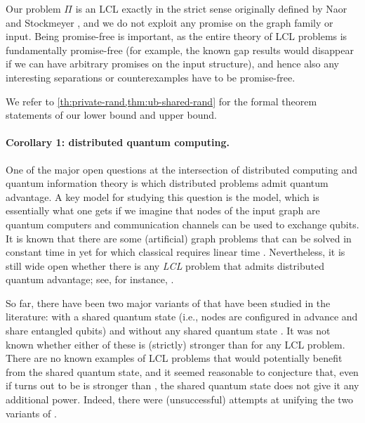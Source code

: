 \documentclass[11pt]{article}
\begin{document}
Our problem $\Pi$ is an LCL exactly in the strict sense originally defined by Naor and Stockmeyer \cite{naor-stockmeyer1995}, and we do not exploit any promise on the graph family or input. Being promise-free is important, as the entire theory of LCL problems is fundamentally promise-free (for example, the known gap results would disappear if we can have arbitrary promises on the input structure), and hence also any interesting separations or counterexamples have to be promise-free.

We refer to \cref{th:private-rand,thm:ub-shared-rand} for the formal theorem statements of our lower bound and upper bound.


\paragraph{Corollary 1: distributed quantum computing.}

One of the major open questions at the intersection of distributed computing and
quantum information theory is which distributed problems admit quantum
advantage. A key model for studying this question is the \qlocal model, which is
essentially what one gets if we imagine that nodes of the input graph are
quantum computers and communication channels can be used to exchange qubits. It
is known that there are some (artificial) graph problems that can be solved in
constant time in \qlocal yet for which classical \local requires linear time
\cite{legall19_quantum_stacs}.
Nevertheless, it is still wide open whether there is any \emph{LCL} problem that
admits distributed quantum advantage; see, for instance,
\cite{akbari24_online_arxiv,coiteux-roy24quantum-coloring}.

So far, there have been two major variants of \qlocal that have been studied in
the literature: \qlocal with a shared quantum state (i.e., nodes are configured
in advance and share entangled qubits) and \qlocal without any shared quantum
state \cite{akbari24_online_arxiv,gavoille2009,arfaoui2014}.
It was not known whether either of these is (strictly) stronger than \randlcl
for any LCL problem. 
There are no known examples of LCL problems that would potentially benefit from
the shared quantum state, and it seemed reasonable to conjecture that, even if
\qlocal turns out to be is stronger than \randlcl, the shared quantum state does
not give it any additional power. 
Indeed, there were (unsuccessful) attempts at unifying the two variants of
\qlocal.
\end{document}
